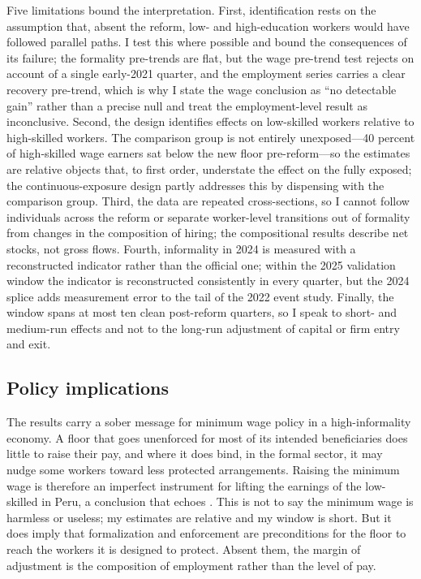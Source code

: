 Five limitations bound the interpretation. First, identification rests on the assumption
that, absent the reform, low- and high-education workers would have followed parallel
paths. I test this where possible and bound the consequences of its failure; the
formality pre-trends are flat, but the wage pre-trend test rejects on account of a single
early-2021 quarter, and the employment series carries a clear recovery pre-trend, which
is why I state the wage conclusion as ``no detectable gain'' rather than a precise null
and treat the employment-level result as inconclusive. Second, the design identifies
effects on low-skilled workers relative to high-skilled workers. The comparison group is
not entirely unexposed---40 percent of high-skilled wage earners sat below the new floor
pre-reform---so the estimates are relative objects that, to first order, understate the
effect on the fully exposed; the continuous-exposure design partly addresses this by
dispensing with the comparison group. Third, the data are repeated cross-sections, so I
cannot follow individuals across the reform or separate worker-level transitions out of
formality from changes in the composition of hiring; the compositional results describe
net stocks, not gross flows. Fourth, informality in 2024 is measured with a reconstructed
indicator rather than the official one; within the 2025 validation window the indicator
is reconstructed consistently in every quarter, but the 2024 splice adds measurement
error to the tail of the 2022 event study. Finally, the window spans at most ten clean
post-reform quarters, so I speak to short- and medium-run effects and not to the long-run
adjustment of capital or firm entry and exit.

\subsection{Policy implications}

The results carry a sober message for minimum wage policy in a high-informality economy. A
floor that goes unenforced for most of its intended beneficiaries does little to raise their
pay, and where it does bind, in the formal sector, it may nudge some workers toward less
protected arrangements. Raising the minimum wage is therefore an imperfect instrument for
lifting the earnings of the low-skilled in Peru, a conclusion that echoes
\citet{jaramillo_lopez_2006}. This is not to say the minimum wage is harmless or useless; my
estimates are relative and my window is short. But it does imply that formalization and
enforcement are preconditions for the floor to reach the workers it is designed to protect.
Absent them, the margin of adjustment is the composition of employment rather than the level of
pay.
